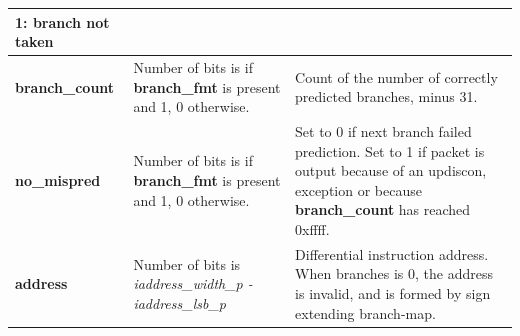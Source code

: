 \begin{table}[htp]
\begin{tabulary}{\textwidth}{|l|p{35mm}|p{80mm}|}
        1: branch not taken \\
        \hline
        \textbf{branch\_count} & Number of bits is  if \textbf{branch\_fmt} is present and 1, 0 otherwise. & 
                     Count of the number of correctly predicted branches, minus 31. \\
        \hline
        \textbf{no\_mispred} & Number of bits is  if \textbf{branch\_fmt} is present and 1, 0 otherwise. & 
                     Set to 0 if next branch failed prediction.  \newline
                     Set to 1 if packet is output because of an updiscon, 
                     exception or because \textbf{branch\_count} has reached 0xffff. \\
        \hline
        \textbf{address}	& Number of bits \newline 
                  is \textit {iaddress\_width\_p - iaddress\_lsb\_p} & 
                    Differential instruction address.  \newline
                    When branches is 0, the address is invalid, and is formed by sign extending branch-map.\\
        \hline
    \end{tabulary}
\end{table}

